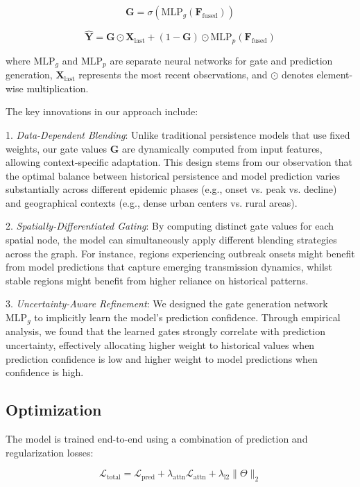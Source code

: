 \documentclass[lettersize, journal]{IEEEtran}
\begin{document}
\begin{equation}
\mathbf{G} = \sigma(\text{MLP}_g(\mathbf{F}_{\text{fused}}))
\end{equation}

\begin{equation}
\hat{\mathbf{Y}} = \mathbf{G} \odot \mathbf{X}_{\text{last}} + (1 - \mathbf{G}) \odot \text{MLP}_p(\mathbf{F}_{\text{fused}})
\end{equation}

where $\text{MLP}_g$ and $\text{MLP}_p$ are separate neural networks for gate and prediction generation, $\mathbf{X}_{\text{last}}$ represents the most recent observations, and $\odot$ denotes element-wise multiplication. 

The key innovations in our approach include:

1. \textit{Data-Dependent Blending}: Unlike traditional persistence models that use fixed weights, our gate values $\mathbf{G}$ are dynamically computed from input features, allowing context-specific adaptation. This design stems from our observation that the optimal balance between historical persistence and model prediction varies substantially across different epidemic phases (e.g., onset vs. peak vs. decline) and geographical contexts (e.g., dense urban centers vs. rural areas).

2. \textit{Spatially-Differentiated Gating}: By computing distinct gate values for each spatial node, the model can simultaneously apply different blending strategies across the graph. For instance, regions experiencing outbreak onsets might benefit from model predictions that capture emerging transmission dynamics, whilst stable regions might benefit from higher reliance on historical patterns.

3. \textit{Uncertainty-Aware Refinement}: We designed the gate generation network $\text{MLP}_g$ to implicitly learn the model's prediction confidence. Through empirical analysis, we found that the learned gates strongly correlate with prediction uncertainty, effectively allocating higher weight to historical values when prediction confidence is low and higher weight to model predictions when confidence is high.

\subsection{Optimization}
The model is trained end-to-end using a combination of prediction and regularization losses:

\begin{equation}
\mathcal{L}_{\text{total}} = \mathcal{L}_{\text{pred}} + \lambda_{\text{attn}}\mathcal{L}_{\text{attn}} + \lambda_{\text{l2}}\|\Theta\|_2
\end{equation}
\end{document}
